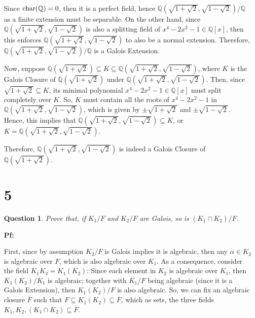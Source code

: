 \documentclass{article}
\newtheorem{question}{Question}
\begin{document}
Since $\textmd{char}(\mathbb{Q})=0$, then it is a perfect field, hence $\mathbb{Q}(\sqrt{1+\sqrt{2}},\sqrt{1-\sqrt{2}})/\mathbb{Q}$ as a finite extension must be separable. On the other hand, since $\mathbb{Q}(\sqrt{1+\sqrt{2}},\sqrt{1-\sqrt{2}})$ is also a splitting field of $x^4-2x^2-1\in \mathbb{Q}[x]$, then this enforces $\mathbb{Q}(\sqrt{1+\sqrt{2}},\sqrt{1-\sqrt{2}})$ to also be a normal extension. Therefore, $\mathbb{Q}(\sqrt{1+\sqrt{2}},\sqrt{1-\sqrt{2}})/\mathbb{Q}$ is a Galois Extension.

Now, suppose $\mathbb{Q}(\sqrt{1+\sqrt{2}})\subseteq K\subseteq \mathbb{Q}(\sqrt{1+\sqrt{2}},\sqrt{1-\sqrt{2}})$, where $K$ is the Galois Closure of $\mathbb{Q}(\sqrt{1+\sqrt{2}})$ under 
$\mathbb{Q}(\sqrt{1+\sqrt{2}},\sqrt{1-\sqrt{2}})$. Then, since $\sqrt{1+\sqrt{2}}\subseteq K$, its minimal polynomial $x^4-2x^2-1\in\mathbb{Q}[x]$ must split completely over $K$. So, $K$ must contain all the roots of $x^4-2x^2-1$ in $\mathbb{Q}(\sqrt{1+\sqrt{2}},\sqrt{1-\sqrt{2}})$, which is given by $\pm\sqrt{1+\sqrt{2}}$ and $\pm\sqrt{1-\sqrt{2}}$. Hence, this implies that $\mathbb{Q}(\sqrt{1+\sqrt{2}},\sqrt{1-\sqrt{2}})\subseteq K$, or $K=\mathbb{Q}(\sqrt{1+\sqrt{2}},\sqrt{1-\sqrt{2}})$.

Therefore, $\mathbb{Q}(\sqrt{1+\sqrt{2}},\sqrt{1-\sqrt{2}})$ is indeed a Galois Closure of $\mathbb{Q}(\sqrt{1+\sqrt{2}})$.

\break

\section*{5}
\begin{myBox}[]{}
    \begin{question}
        Prove that, if $K_1/F$ and $K_2/F$ are Galois, so is $(K_1\cap K_2)/F$.
    \end{question}
\end{myBox}

\textbf{Pf:}

First, since by assumption $K_2/F$ is Galois implies it is algebraic, then any $\alpha\in K_2$ is algebraic over $F$, which is also algebraic over $K_1$. As a consequence, consider the field $K_1K_2 = K_1(K_2)$: Since each element in $K_2$ is algebraic over $K_1$, then $K_1(K_2)/K_1$ is algebraic; together with $K_1/F$ being algebraic (since it is a Galois Extension), then $K_1(K_2)/F$ is also algebraic. So, we can fix an algebraic closure $\overline{F}$ such that $F\subseteq K_1(K_2)\subseteq \overline{F}$, which as sets, the three fields $K_1, K_2, (K_1\cap K_2)\subseteq \overline{F}$.
\end{document}
